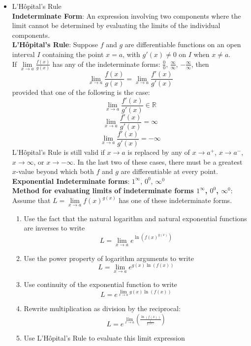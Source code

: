 \documentclass{article}
\begin{document}
\begin{itemize}
    \item L'Hôpital's Rule \\
    \textbf{Indeterminate Form}: An expression involving two components where the limit cannot be determined by evaluating the limits of the individual components. \\
    \textbf{L'Hôpital's Rule}: Suppose $f$ and $g$ are differentiable functions on an open interval $I$ containing the point $x = a$, with $g'(x) \neq 0$ on $I$ when $x \neq a$. \\
    If $\lim\limits_{x \to a}{\frac{f(x)}{g(x)}}$ has any of the indeterminate forms: $\frac{0}{0}$, $\frac{\infty}{\infty}$, $-\frac{\infty}{\infty}$, then
    $$\lim_{x \to a}{\frac{f(x)}{g(x)}} = \lim_{x \to a}{\frac{f'(x)}{g'(x)}}$$
    provided that one of the following is the case:
    $$\lim_{x \to a}{\frac{f'(x)}{g'(x)}} \in \mathbb{R}$$
    $$\lim_{x \to a}{\frac{f'(x)}{g'(x)}} = \infty$$
    $$\lim_{x \to a}{\frac{f'(x)}{g'(x)}} = -\infty$$
    L'Hôpital's Rule is still valid if $x \to a$ is replaced by any of $x \to a^+$, $x \to a^-$, $x \to \infty$, or $x \to -\infty$. In the last two of these cases, there must be a greatest $x$-value beyond which both $f$ and $g$ are differentiable at every point. \\
    \textbf{Exponential Indeterminate forms}: $1^{\infty}$, $0^0$, $\infty^0$ \\
    \textbf{Method for evaluating limits of indeterminate forms $1^{\infty}$, $0^0$, $\infty^0$}: \\
    Assume that $L = \lim\limits_{x \to a}{f(x)^{g(x)}}$ has one of these indeterminate forms.
    \begin{enumerate}
        \item Use the fact that the natural logarithm and natural exponential functions are inverses to write
        $$L = \lim_{x \to a}{e^{\ln{\left(f(x)^{g(x)}\right)}}}$$
        \item Use the power property of logarithm arguments to write
        $$L = \lim_{x \to a}{e^{g(x)\ln{\left(f(x)\right)}}}$$
        \item Use continuity of the exponential function to write
        $$L = e^{\lim\limits_{x \to a}{g(x)\ln{\left(f(x)\right)}}}$$
        \item Rewrite multiplication as division by the reciprocal:
        $$L = e^{\lim\limits_{x \to a}{\left(\frac{\ln{\left(f(x)\right)}}{\frac{1}{g(x)}}\right)}}$$
        \item Use L'Hôpital's Rule to evaluate this limit expression

\end{enumerate}
\end{itemize}
\end{document}
